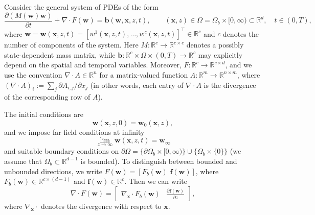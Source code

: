 \documentclass{article}
\newcommand{\Rbb}{\mathbb{R}}
\newcommand{\wbf}{\mathbf{w}}
\newcommand{\bbf}{\mathbf{b}}
\newcommand{\xbf}{\mathbf{x}}
\newcommand{\fbf}{\mathbf{f}}
\begin{document}
	Consider the general system of PDEs of the form
	\begin{equation}\label{system}
		\frac{\partial(M(\wbf)\wbf)}{\partial t}+\nabla\cdot F(\wbf)=\bbf(\wbf,\xbf,z,t), \qquad (\xbf,z)\in\Omega=\Omega_b\times[0,\infty)\subset\Rbb^d,\quad t\in(0,T),
	\end{equation}
	where $\wbf=\wbf(\xbf,z,t)=[w^1(\xbf,z,t),\dots,w^c(\xbf,z,t)]^\top\in\Rbb^c$ and $c$ denotes the number of components of the system. Here $M:\Rbb^c\to\Rbb^{c\times c}$ denotes a possibly state-dependent mass matrix, while $\bbf:\Rbb^c\times\Omega\times(0,T)\to\Rbb^c$ may explicitly depend on the spatial and temporal variables. Moreover, $F:\Rbb^c\to\Rbb^{c\times d}$, and we use the convention $\nabla\cdot A\in\Rbb^n$ for a matrix-valued function $A:\Rbb^m\to\Rbb^{n\times m}$, where $(\nabla\cdot A)_i := \sum_j\partial A_{i,j}/\partial x_j$ (in other words, each entry of $\nabla\cdot A$ is the divergence of the corresponding row of $A$). 
	
	The initial conditions are
	\begin{equation*}
		\wbf(\xbf,z,0) = \wbf_0(\xbf,z),
	\end{equation*}
	and we impose far field conditions at infinity
	\begin{equation*}
		\lim_{z\to\infty}\wbf(\xbf,z,t) = \wbf_\infty
	\end{equation*}
	and suitable boundary conditions on $\partial\Omega=\{\partial\Omega_b\times[0,\infty)\}\cup\{\Omega_b\times\{0\}\}$ (we assume that $\Omega_b\subset\Rbb^{d-1}$ is bounded). To distinguish between bounded and unbounded directions, we write $F(\wbf)=[F_b(\wbf)\,\,\fbf(\wbf)]$, where $F_b(\wbf)\in\Rbb^{c\times(d-1)}$ and $\fbf(\wbf)\in\Rbb^c$. Then we can write
	\begin{equation*}
		\nabla\cdot F(\wbf) = \begin{bmatrix}
			\nabla_\xbf\cdot F_b(\wbf) & \displaystyle\frac{\partial \fbf(\wbf)}{\partial z}
		\end{bmatrix},
	\end{equation*}
	where $\nabla_\xbf\cdot$ denotes the divergence with respect to $\xbf$. 
	
\end{document}
